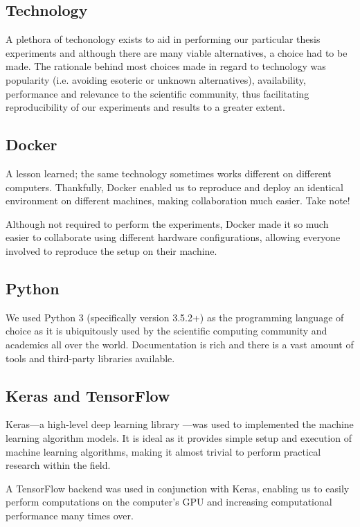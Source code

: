 \begin{multicols}{2}
\section{Technology}

A plethora of techonology exists to aid in performing our particular thesis
experiments and although there are many viable alternatives, a choice had to be
made.  The rationale behind most choices made in regard to technology was
popularity (i.e. avoiding esoteric or unknown alternatives), availability,
performance and relevance to the scientific community, thus facilitating
reproducibility of our experiments and results to a greater extent.

\subsection{Docker}

A lesson learned; the same technology sometimes works different on different
computers.  Thankfully, Docker enabled us to reproduce and deploy an identical
environment on different machines, making collaboration much easier. Take note!

Although not required to perform the experiments, Docker made it so much easier
to collaborate using different hardware configurations, allowing everyone
involved to reproduce the setup on their machine.

\subsection{Python}

We used Python 3 (specifically version 3.5.2+) as the programming language of
choice as it is ubiquitously used by the scientific computing community and
academics all over the world.  Documentation is rich and there is a vast amount
of tools and third-party libraries available.

\subsection{Keras and TensorFlow}

Keras---a high-level deep learning library \citep{chollet2015}---was used to
implemented the machine learning algorithm models.  It is ideal as it provides
simple setup and execution of machine learning algorithms, making it almost
trivial to perform practical research within the field.

A TensorFlow \citep{tensorflow2015-whitepaper} backend was used in conjunction
with Keras, enabling us to easily perform computations on the computer's GPU and
increasing computational performance many times over.


\end{multicols}
